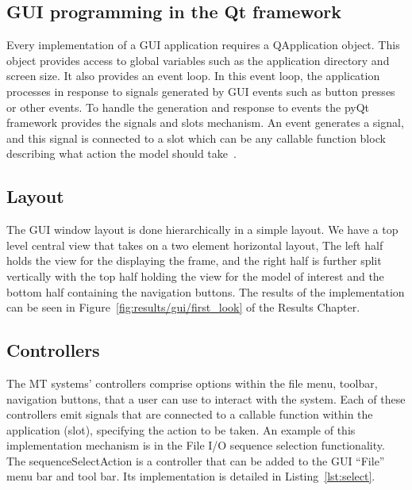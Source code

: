 \subsection{GUI programming in the Qt framework}
Every implementation of a GUI application requires a QApplication object. This
object provides access to global variables such as the application directory and
screen size. It also provides an event loop. In this event loop, the application
processes in response to signals generated by GUI events such as button
presses or other events.
To handle the generation and response to events the pyQt framework provides the
signals and slots mechanism. An event generates a signal, and this signal is
connected to a slot which can be any callable function block describing what
action the model should take~\cite{Summerfield}.

\subsection{Layout}
The GUI window layout is done hierarchically in a simple layout. We have a top
level central view that takes on a two element horizontal layout, The left half
holds the view for the displaying the frame, and the right half is further split
vertically with the top half holding the view for the model of interest and the
bottom half containing the navigation buttons.
The results of the implementation can be seen in
Figure~\ref{fig:results/gui/first_look} of the Results Chapter.

\subsection{Controllers}
The MT systems' controllers comprise options within the file menu, toolbar,
navigation buttons, that a user can use to interact with the system. Each of
these controllers emit signals that are connected to a callable function within
the application (slot), specifying the action to be taken.
An example of this implementation mechanism is in the File I/O sequence
selection functionality. 
The sequenceSelectAction is a controller that can be added to the GUI ``File'' menu
bar and tool bar. Its implementation is detailed in Listing~\ref{lst:select}. 

